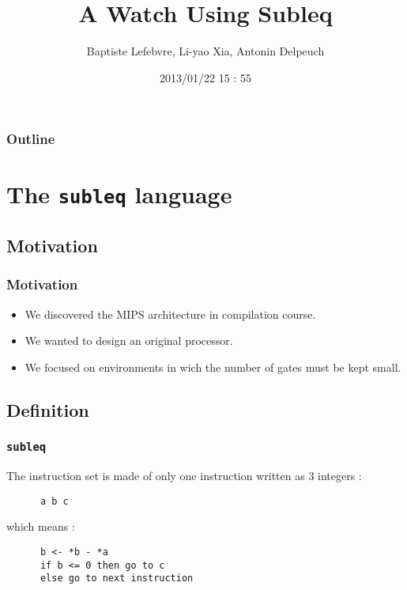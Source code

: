 \documentclass[slidestop]{beamer}
\begin{document}
\makeatletter

\title{A Watch Using Subleq}
\author{Baptiste Lefebvre, Li-yao Xia, Antonin Delpeuch}
\date{2013/01/22 15 : 55}

\begin{frame}
    \maketitle
\end{frame}

\begin{frame}
    \frametitle{Outline}
    \tableofcontents
\end{frame}
\section{The \texttt{subleq} language}
\subsection{Motivation}

\begin{frame}
    \frametitle{Motivation}

    \begin{itemize}
        \item We discovered the MIPS architecture in compilation course.
        \item We wanted to design an original processor.
        \item We focused on environments in wich the number of gates must be kept small.
    \end{itemize}

\end{frame}

\subsection{Definition}
\begin{frame}[fragile]
    \frametitle{\texttt{subleq}}

    The instruction set is made of only one instruction written as 3
    integers :
    \\[11pt]
    \begin{lstlisting}
      a b c
    \end{lstlisting}
    which means :

    \begin{lstlisting}
      b <- *b - *a
      if b <= 0 then go to c
      else go to next instruction
    \end{lstlisting}

\end{frame}
\end{document}
